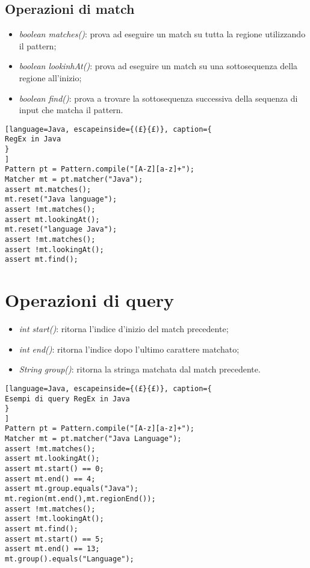 \subsection{Operazioni di match}
\begin{itemize}
  \item \emph{boolean matches()}: prova ad eseguire un match su tutta la regione
    utilizzando il pattern;
\item \emph{boolean lookinhAt()}: prova ad eseguire un match su una
  sottosequenza della regione all'inizio;
\item \emph{boolean find()}: prova a trovare la sottosequenza successiva della
  sequenza di input che matcha il pattern.
\end{itemize}

\begin{lstlisting}[language=Java, escapeinside={(£}{£)}, caption={
RegEx in Java
}
]
Pattern pt = Pattern.compile("[A-Z][a-z]+");
Matcher mt = pt.matcher("Java");
assert mt.matches();
mt.reset("Java language");
assert !mt.matches();
assert mt.lookingAt();
mt.reset("language Java");
assert !mt.matches();
assert !mt.lookingAt();
assert mt.find();
\end{lstlisting}

\section{Operazioni di query}
\begin{itemize}
  \item \emph{int start()}: ritorna l'indice d'inizio del match precedente;
  \item \emph{int end()}: ritorna l'indice dopo l'ultimo carattere matchato;
  \item \emph{String group()}: ritorna la stringa matchata dal match
    precedente.
\end{itemize}

\begin{lstlisting}[language=Java, escapeinside={(£}{£)}, caption={
Esempi di query RegEx in Java
}
]
Pattern pt = Pattern.compile("[A-z][a-z]+");
Matcher mt = pt.matcher("Java Language");
assert !mt.matches();
assert mt.lookingAt();
assert mt.start() == 0;
assert mt.end() == 4;
assert mt.group.equals("Java");
mt.region(mt.end(),mt.regionEnd());
assert !mt.matches();
assert !mt.lookingAt();
assert mt.find();
assert mt.start() == 5;
assert mt.end() == 13;
mt.group().equals("Language");
\end{lstlisting}

